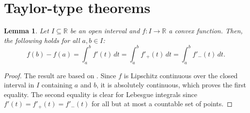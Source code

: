 \documentclass[12pt]{amsart}
\def\Rset{\mathbb{R}}
\newcommand{\0}{\mat{0}}
\newcommand{\1}{\mathds{1}}
\newtheorem{lemma}[theorem]{Lemma}
\begin{document}
\section{Taylor-type theorems}



\begin{lemma}
\label{lemma:absolute}
Let $I \subseteq \Rset$ be an open interval and $f\colon I \to \Rset$
a convex function. Then, the following holds for all $a, b \in I$:
\begin{equation*}
f(b) - f(a) = \int_a^b f'(t)\, dt = \int_a^b f'_+(t)\, dt = \int_a^b f'_-(t)\, dt.
\end{equation*}
\end{lemma}

\begin{proof}
  The result are based on \citep{MohriRostamizadehTalwalkar2012}.
  Since $f$ is Lipschitz continuous over the closed interval in $I$
  containing $a$ and $b$, it is absolutely continuous, which proves
  the first equality. The second equality is clear for Lebesgue
  integrals since $f'(t) = f'_+(t) = f'_-(t)$ for all but at most a
  countable set of points.
\end{proof}


 

\end{document}
